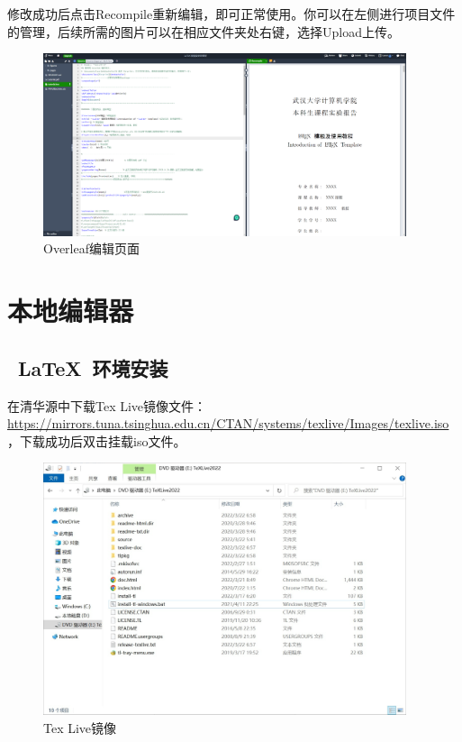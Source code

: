 修改成功后点击Recompile重新编辑，即可正常使用。你可以在左侧进行项目文件的管理，后续所需的图片可以在相应文件夹处右键，选择Upload上传。

\begin{figure}[htb]
  \centering
  \includegraphics[width=0.95\textwidth]{figures/chapter2/overleaf-edit.png}
  \caption{Overleaf编辑页面}
  \label{fig:2-overleaf-edit}
\end{figure}

\section{本地编辑器}

\subsection{~\LaTeX~环境安装}

在清华源中下载Tex Live镜像文件：\url{https://mirrors.tuna.tsinghua.edu.cn/CTAN/systems/texlive/Images/texlive.iso}，下载成功后双击挂载iso文件。


\begin{figure}[htb]
  \centering
  \includegraphics[width=0.95\textwidth]{figures/chapter2/texlive-iso.png}
  \caption{Tex Live镜像}
  \label{fig:2-texlive-iso}
\end{figure}

